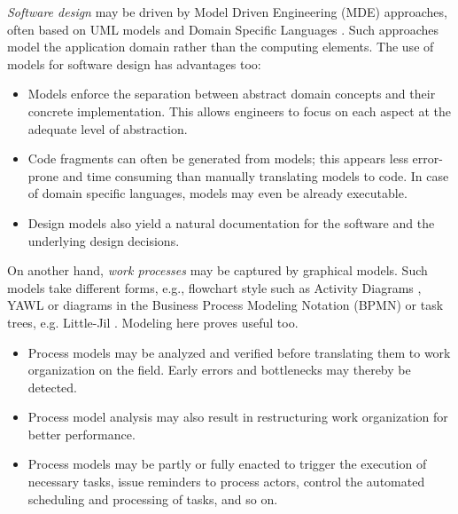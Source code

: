 \emph{Software design} may be driven by Model Driven Engineering (MDE) approaches, often based on UML models \cite{OMG:2004} and Domain Specific Languages \cite{VanDeursen:2000, Fowler:2010}. Such approaches model the application domain rather than the computing elements. The use of models for software design has advantages too:
\begin{itemize}
\item Models enforce the separation between abstract domain concepts and their concrete implementation. This allows engineers to focus on each aspect at the adequate level of abstraction.
\item Code fragments can often be generated from models; this appears less error-prone and time consuming than manually translating models to code. In case of domain specific languages, models may even be already executable. 
\item Design models also yield a natural documentation for the software and the underlying design decisions. 
\end{itemize}


On another hand, \emph{work processes} may be captured by graphical models. Such models take different forms, e.g., flowchart style such as Activity Diagrams \cite{OMG:2004}, YAWL \cite{Vanderaalst:2005} or diagrams in the Business Process Modeling Notation (BPMN) \cite{OMG:2008} or task trees, e.g. Little-Jil \cite{Clarke:2008}. Modeling here proves useful too.
\begin{itemize}
\item Process models may be analyzed and verified before translating them to work organization on the field. Early errors and bottlenecks may thereby be detected.
\item Process model analysis may also result in restructuring work organization for better performance.
\item Process models may be partly or fully enacted to trigger the execution of necessary tasks, issue reminders to process actors, control the automated scheduling and processing of tasks, and so on.
\end{itemize}
